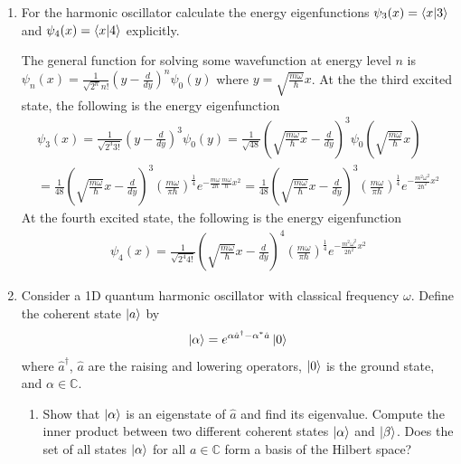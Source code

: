 \documentclass[10pt,letterpaper]{article}
\begin{document}
\begin{enumerate}
\color{black}

\item For the harmonic oscillator calculate the energy eigenfunctions $\psi_{3}(x) = \braket{x | 3}$ and $\psi_{4}(x) = \braket{x | 4}$ explicitly. 

\color{violet}
The general function for solving some wavefunction at energy level $n$ is $\psi_{n}(x) = \frac{1}{\sqrt{2^{n}}n!}(y - \frac{d}{dy})^{n}\psi_{0}(y)$ where $y = \sqrt{\frac{m\omega}{\hbar}}x$. At the the third excited state, the following is the energy eigenfunction
\begin{gather*}
\psi_{3}(x) = \frac{1}{\sqrt{2^{3}3!}}\left(y - \frac{d}{dy}\right)^{3}\psi_{0}(y) = \frac{1}{\sqrt{48}}\left( \sqrt{\frac{m\omega}{\hbar}x} - \frac{d}{dy}  \right)^{3}\psi_{0}\left(\sqrt{\frac{m\omega}{\hbar}}x\right) \\
= \frac{1}{48}\left( \sqrt{\frac{m\omega}{\hbar}}x - \frac{d}{dy} \right)^{3} \left( \frac{m\omega}{\pi\hbar} \right)^{\frac{1}{4}} e^{-\frac{m\omega}{2\hbar}\frac{m\omega}{\hbar}x^{2}} = \frac{1}{48}\left( \sqrt{\frac{m\omega}{\hbar}}x - \frac{d}{dy} \right)^{3} \left( \frac{m\omega}{\pi\hbar} \right)^{\frac{1}{4}} e^{-\frac{m^{2}\omega^{2}}{2\hbar^{2}}x^{2}} 
\end{gather*}
At the fourth excited state, the following is the energy eigenfunction
\begin{gather*}
\psi_{4}(x) = \frac{1}{\sqrt{2^{4}4!}} \left( \sqrt{\frac{m\omega}{\hbar}}x - \frac{d}{dy} \right)^{4}\left( \frac{m\omega}{\pi\hbar} \right)^{\frac{1}{4}} e^{-\frac{m^{2}\omega^{2}}{2\hbar^{2}}x^{2}}
\end{gather*}
\color{black}

\item Consider a 1D quantum harmonic oscillator with classical frequency $\omega$. Define the coherent state $\ket{a}$ by 
$$\ket{\alpha} = e^{\alpha\hat{a}^{\dagger} - \alpha^{*}\hat{a} }\ket{0}$$
where $\hat{a}^{\dagger}$, $\hat{a}$ are the raising and lowering operators, $\ket{0}$ is the ground state, and $\alpha \in \mathbb{C}$. 

\begin{enumerate}

\item Show that $\ket{\alpha}$ is an eigenstate of $\hat{a}$ and find its eigenvalue. Compute the inner product between two different coherent states $\ket{\alpha}$ and $\ket{\beta}$. Does the set of all states $\ket{\alpha}$ for all $a \in \mathbb{C}$ form a basis of the Hilbert space?


\end{enumerate}
\end{enumerate}
\end{document}

